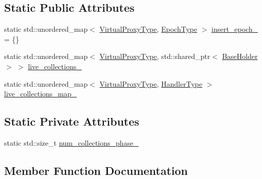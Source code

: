 \subsection*{Static Public Attributes}
\begin{DoxyCompactItemize}
\item 
static std\+::unordered\+\_\+map$<$ \hyperlink{namespacevt_a1b417dd5d684f045bb58a0ede70045ac}{Virtual\+Proxy\+Type}, \hyperlink{namespacevt_a985a5adf291c34a3ca263b3378388236}{Epoch\+Type} $>$ \hyperlink{structvt_1_1vrt_1_1collection_1_1_universal_index_holder_a9fbea00587a7d5028c3ae3cf124a3930}{insert\+\_\+epoch\+\_\+} = \{\}
\item 
static std\+::unordered\+\_\+map$<$ \hyperlink{namespacevt_a1b417dd5d684f045bb58a0ede70045ac}{Virtual\+Proxy\+Type}, std\+::shared\+\_\+ptr$<$ \hyperlink{structvt_1_1vrt_1_1collection_1_1_base_holder}{Base\+Holder} $>$ $>$ \hyperlink{structvt_1_1vrt_1_1collection_1_1_universal_index_holder_af67ddae79d782cc9c51a13e34997cd59}{live\+\_\+collections\+\_\+}
\item 
static std\+::unordered\+\_\+map$<$ \hyperlink{namespacevt_a1b417dd5d684f045bb58a0ede70045ac}{Virtual\+Proxy\+Type}, \hyperlink{namespacevt_af64846b57dfcaf104da3ef6967917573}{Handler\+Type} $>$ \hyperlink{structvt_1_1vrt_1_1collection_1_1_universal_index_holder_a42b948be40223918c12a531e2f7a290e}{live\+\_\+collections\+\_\+map\+\_\+}
\end{DoxyCompactItemize}
\subsection*{Static Private Attributes}
\begin{DoxyCompactItemize}
\item 
static std\+::size\+\_\+t \hyperlink{structvt_1_1vrt_1_1collection_1_1_universal_index_holder_ab07d976281f76b772732431484120be4}{num\+\_\+collections\+\_\+phase\+\_\+}
\end{DoxyCompactItemize}


\subsection{Member Function Documentation}
\mbox{\label{structvt_1_1vrt_1_1collection_1_1_universal_index_holder_a4403caeab7e7cc22ec0bfcf18c212e1e}} 
